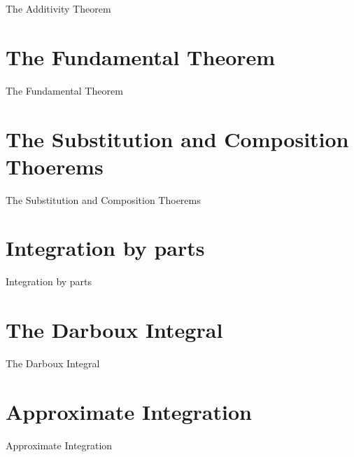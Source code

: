 The Additivity Theorem

\section{The Fundamental Theorem}
\label{sec:the-fundamental-theorem}

The Fundamental Theorem

\section{The Substitution and Composition Thoerems}
\label{sec:the-substitution-and-composition-thoerems}

The Substitution and Composition Thoerems

\section{Integration by parts}
\label{sec:integration-by-parts}

Integration by parts

\section{The Darboux Integral}
\label{sec:the-darboux-integral}

The Darboux Integral

\section{Approximate Integration}
\label{sec:approximate-integration}

Approximate Integration

